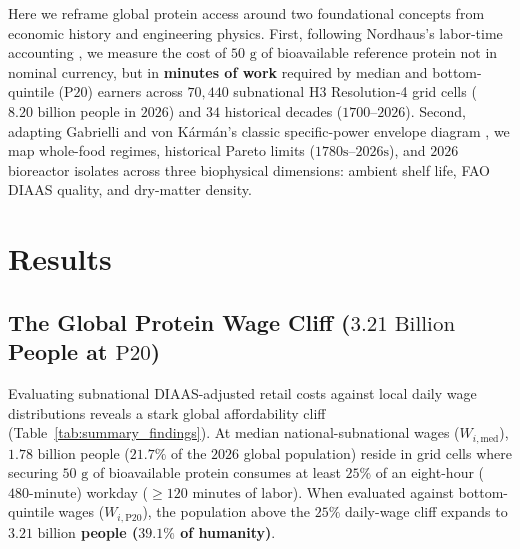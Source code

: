 \documentclass[11pt,a4paper]{article}
\begin{document}
Here we reframe global protein access around two foundational concepts from economic history and engineering physics. First, following Nordhaus's labor-time accounting \cite{nordhaus1996}, we measure the cost of $50\text{ g}$ of bioavailable reference protein not in nominal currency, but in \textbf{minutes of work} required by median and bottom-quintile ($\text{P20}$) earners across $70{,}440$ subnational H3 Resolution-4 grid cells ($8.20\text{ billion}$ people in $2026$) and $34$ historical decades ($1700\text{--}2026$). Second, adapting Gabrielli and von K\'arm\'an's classic specific-power envelope diagram \cite{gabrielli1950}, we map whole-food regimes, historical Pareto limits ($1780\text{s--}2026\text{s}$), and $2026$ bioreactor isolates across three biophysical dimensions: ambient shelf life, FAO DIAAS quality, and dry-matter density.

\section{Results}

\subsection{The Global Protein Wage Cliff ($3.21\text{ Billion}$ People at $\text{P20}$)}
Evaluating subnational DIAAS-adjusted retail costs against local daily wage distributions reveals a stark global affordability cliff (Table~\ref{tab:summary_findings}). At median national-subnational wages ($W_{i,\text{med}}$), $1.78\text{ billion}$ people ($21.7\%$ of the $2026$ global population) reside in grid cells where securing $50\text{ g}$ of bioavailable protein consumes at least $25\%$ of an eight-hour ($480\text{-minute}$) workday ($\ge 120\text{ minutes}$ of labor). When evaluated against bottom-quintile wages ($W_{i,\text{P20}}$), the population above the $25\%$ daily-wage cliff expands to \textbf{$3.21\text{ billion}$ people ($39.1\%$ of humanity)}.
\end{document}
